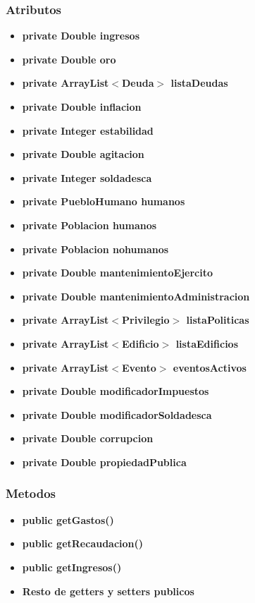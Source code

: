 \documentclass[12pt,a4paper]{article}
\begin{document}
        \subsubsection{Atributos}
        \begin{itemize}
            \item \textbf{private Double ingresos}
            \item \textbf{private Double oro}
            \item \textbf{private ArrayList$<$Deuda$>$ listaDeudas}
            \item \textbf{private Double inflacion}
            \item \textbf{private Integer estabilidad}
            \item \textbf{private Double agitacion}
            \item \textbf{private Integer soldadesca} 
            \item \textbf{private PuebloHumano humanos}
            \item \textbf{private Poblacion humanos} 
            \item \textbf{private Poblacion nohumanos}
            \item \textbf{private Double mantenimientoEjercito}
            \item \textbf{private Double mantenimientoAdministracion}
            \item \textbf{private ArrayList$<$Privilegio$>$ listaPoliticas}
            \item \textbf{private ArrayList$<$Edificio$>$ listaEdificios}
            \item \textbf{private ArrayList$<$Evento$>$ eventosActivos}
            \item \textbf{private Double modificadorImpuestos}
            \item \textbf{private Double modificadorSoldadesca}
            \item \textbf{private Double corrupcion}
            \item \textbf{private Double propiedadPublica}
        \end{itemize}
        \subsubsection{Metodos}
        \begin{itemize}
            \item \textbf{public getGastos()}
            \item \textbf{public getRecaudacion()}
            \item \textbf{public getIngresos()}
            \item \textbf{Resto de getters y setters publicos}
        \end{itemize}
\end{document}
